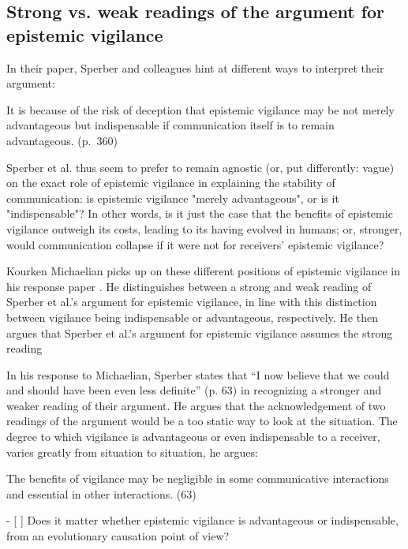 \subsection{Strong vs. weak readings of the argument for epistemic vigilance}

In their \citeyear{Sperber10} paper, Sperber and colleagues hint at different ways to interpret their argument:

\begin{quoting}
    It is because of the risk of deception that epistemic vigilance may be not merely advantageous but indispensable if communication itself is to remain advantageous.
\hfill (p.~360)
\end{quoting}
Sperber et al. thus seem to prefer to remain agnostic (or, put differently: vague) on the exact role of epistemic vigilance in explaining the stability of communication: is epistemic vigilance "merely advantageous", or is it "indispensable"? In other words, is it just the case that the benefits of epistemic vigilance outweigh its costs, leading to its having evolved in humans; or, stronger, would communication collapse if it were not for receivers' epistemic vigilance?

Kourken Michaelian picks up on these different positions of epistemic vigilance in his response paper \citeyear{Michaelian13}. He distinguishes between a strong and weak reading of Sperber et al.'s argument for epistemic vigilance, in line with this distinction between vigilance being indispensable or advantageous, respectively. He then argues that Sperber et al.'s argument for epistemic vigilance assumes the strong reading

In his response to Michaelian, Sperber states that “I now believe that we could and should have been even less definite” (p. 63) in recognizing a stronger and weaker reading of their argument. He argues that the acknowledgement of two readings of the argument would be a too static way to look at the situation. The degree to which vigilance is advantageous or even indispensable to a receiver, varies greatly from situation to situation, he argues:

The benefits of vigilance may be negligible in some communicative interactions and essential in other interactions. 
(63)

- [ ]  Does it matter whether epistemic vigilance is advantageous or indispensable, from an evolutionary causation point of view?
    
